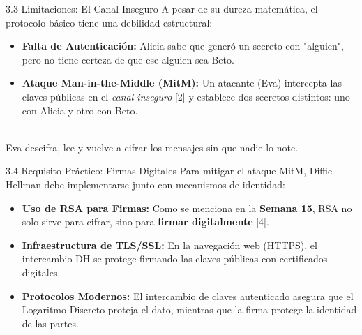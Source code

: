 \documentclass{beamer}
\begin{document}
\begin{frame}{3.3 Limitaciones: El Canal Inseguro}
    A pesar de su dureza matemática, el protocolo básico tiene una debilidad estructural:
    \begin{itemize}
        \item \textbf{Falta de Autenticación:} Alicia sabe que generó un secreto con "alguien", pero no tiene certeza de que ese alguien sea Beto.
        \item \textbf{Ataque Man-in-the-Middle (MitM):} Un atacante (Eva) intercepta las claves públicas en el \textit{canal inseguro} [2] y establece dos secretos distintos: uno con Alicia y otro con Beto.
    \end{itemize}
    
    \begin{center}
        \\ \small{Eva descifra, lee y vuelve a cifrar los mensajes sin que nadie lo note.}
    \end{center}
\end{frame}

\begin{frame}{3.4 Requisito Práctico: Firmas Digitales}
    Para mitigar el ataque MitM, Diffie-Hellman debe implementarse junto con mecanismos de identidad:
    \begin{itemize}
        \item \textbf{Uso de RSA para Firmas:} Como se menciona en la \textbf{Semana 15}, RSA no solo sirve para cifrar, sino para \textbf{firmar digitalmente} [4].
        \item \textbf{Infraestructura de TLS/SSL:} En la navegación web (HTTPS), el intercambio DH se protege firmando las claves públicas con certificados digitales.
        \item \textbf{Protocolos Modernos:} El intercambio de claves autenticado asegura que el Logaritmo Discreto proteja el dato, mientras que la firma protege la identidad de las partes.
    \end{itemize}
\end{frame}

\end{document}
